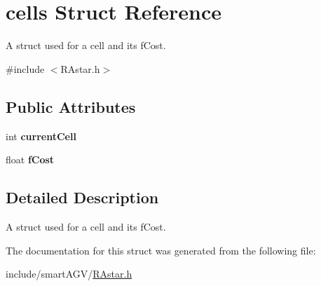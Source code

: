 \hypertarget{structcells}{}\section{cells Struct Reference}
\label{structcells}


A struct used for a cell and its f\+Cost.  




{\ttfamily \#include $<$R\+Astar.\+h$>$}

\subsection*{Public Attributes}
\begin{DoxyCompactItemize}
\item 
int {\bfseries current\+Cell}\hypertarget{structcells_a6eb77b36d9c07b3c27ad042f84f9a15c}{}\label{structcells_a6eb77b36d9c07b3c27ad042f84f9a15c}

\item 
float {\bfseries f\+Cost}\hypertarget{structcells_a4d0c0cf565b38ce72707d7d0dc2d7630}{}\label{structcells_a4d0c0cf565b38ce72707d7d0dc2d7630}

\end{DoxyCompactItemize}


\subsection{Detailed Description}
A struct used for a cell and its f\+Cost. 

The documentation for this struct was generated from the following file\+:\begin{DoxyCompactItemize}
\item 
include/smart\+A\+G\+V/\hyperlink{_r_astar_8h}{R\+Astar.\+h}\end{DoxyCompactItemize}
